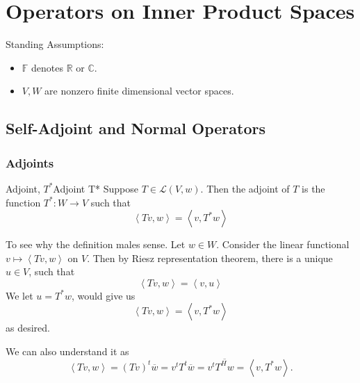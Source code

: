 \documentclass[../main.tex]{subfiles}
\begin{document}
\chapter{Operators on Inner Product Spaces}

\begin{plainblackenv}
Standing Assumptions:
\tcblower
\begin{itemize}
\item $\mathbb{F}$ denotes $\mathbb{R}$ or $\mathbb{C}$.
\item $V,W$ are nonzero finite dimensional vector spaces.
\end{itemize}
\end{plainblackenv}

\section{Self-Adjoint and Normal Operators}
\subsection{Adjoints}

\begin{definition}{Adjoint, $T^*$}{Adjoint T*}
Suppose $T\in \mathscr{L}(V,w)$. Then the adjoint of $T$ is the function $T^*: W \rightarrow V$ such that
\begin{equation}
\left<Tv,w\right> = \left<v,T^*w\right> 
\end{equation}
\end{definition}

To see why the definition males sense. Let $w\in W$. Consider the linear functional $v \mapsto \left<Tv,w\right> $ on $V $. Then by Riesz representation theorem, there is a unique $u\in V$, such that
\begin{equation*}
\left<Tv,w\right> = \left<v,u\right>
\end{equation*}
We let $u = T^*w$, would give us
\begin{equation*}
\left<Tv,w\right> = \left<v,T^*w\right> 
\end{equation*}
as desired.

We can also understand it as
\begin{equation*}
\left<Tv,w\right> = (Tv)^t \overline{w} = v^t T^t \overline{w} = v^t \overline{T^H w} = \left<v,T^*w\right>.
\end{equation*}
\end{document}
